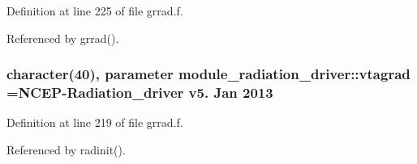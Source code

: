 Definition at line 225 of file grrad.\+f.



Referenced by grrad().

\subsubsection[{\texorpdfstring{vtagrad}{vtagrad}}]{\setlength{\rightskip}{0pt plus 5cm}character(40), parameter module\+\_\+radiation\+\_\+driver\+::vtagrad =\textquotesingle{}N\+C\+EP-\/Radiation\+\_\+driver v5. Jan 2013 \textquotesingle{}\hspace{0.3cm}{\ttfamily [private]}}\hypertarget{namespacemodule__radiation__driver_a70a36595385cf1f5794f9c5859e52ab6}{}\label{namespacemodule__radiation__driver_a70a36595385cf1f5794f9c5859e52ab6}


Definition at line 219 of file grrad.\+f.



Referenced by radinit().

